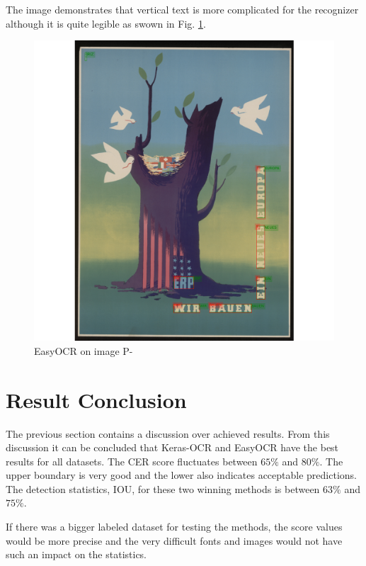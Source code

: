 The image %
demonstrates that vertical text is more complicated for the recognizer although it is quite legible as swown in Fig. \ref{Im7:ex:easy}.

\begin{figure}[hbtp!]
    \centering
    \includegraphics[width=\textwidth]{obrazky/plakaty/result_easyOCR_vienna1_split_tuning_special_sensitive-60verticaltextproblem.png}
    \caption{EasyOCR on image P-}
    \label{Im7:ex:easy}
\end{figure}


\newpage
\section*{Result Conclusion}

The previous section contains a discussion over achieved results. From this discussion it can be concluded that Keras-OCR and EasyOCR have the best results for all datasets. The CER score fluctuates between $65\%$ and $80\%$. The upper boundary is very good and the lower also indicates acceptable predictions. The detection statistics, IOU, for these two winning methods is between $63\%$ and $75\%$.

If there was a bigger labeled dataset for testing the methods, the score values would be more precise and the very difficult fonts and images would not have such an impact on the statistics.

